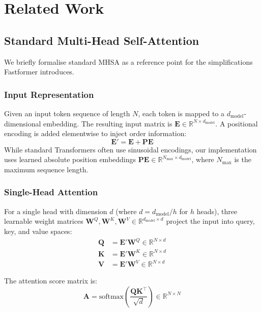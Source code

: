 \documentclass[11pt,a4paper]{article}
\newcommand{\mat}[1]{\mathbf{#1}}
\newcommand{\R}{\mathbb{R}}
\theoremstyle{definition}
\begin{document}
\section{Related Work}
\label{sec:related}

\subsection{Standard Multi-Head Self-Attention}
\label{sec:background}

We briefly formalise standard MHSA as a reference point for the simplifications Fastformer
introduces.

\subsubsection{Input Representation}

Given an input token sequence of length $N$, each token is mapped to a $d_{\text{model}}$-dimensional
embedding.
The resulting input matrix is $\mat{E}\in\R^{N\times d_{\text{model}}}$.
A positional encoding is added elementwise to inject order information:
\begin{equation*}
  \mat{E}' = \mat{E} + \mat{PE}
\end{equation*}
While standard Transformers often use sinusoidal encodings, our implementation uses learned absolute position embeddings $\mat{PE} \in \R^{N_{\text{max}}\times d_{\text{model}}}$, where $N_{\text{max}}$ is the maximum sequence length.

\subsubsection{Single-Head Attention}

For a single head with dimension $d$ (where $d = d_{\text{model}}/h$ for $h$ heads), three
learnable weight matrices $\mat{W}^{Q},\mat{W}^{K},\mat{W}^{V}\in\R^{d_{\text{model}}\times d}$
project the input into query, key, and value spaces:
\begin{align*}
  \mat{Q} &= \mat{E}'\mat{W}^{Q} \in \R^{N\times d} \\
  \mat{K} &= \mat{E}'\mat{W}^{K} \in \R^{N\times d} \\
  \mat{V} &= \mat{E}'\mat{W}^{V} \in \R^{N\times d}
\end{align*}

The attention score matrix is:
\begin{equation}
  \mat{A} = \text{softmax}\!\left(\frac{\mat{Q}\mat{K}^{\top}}{\sqrt{d}}\right) \in \R^{N\times N}
  \label{eq:attn_matrix}
\end{equation}
\end{document}
